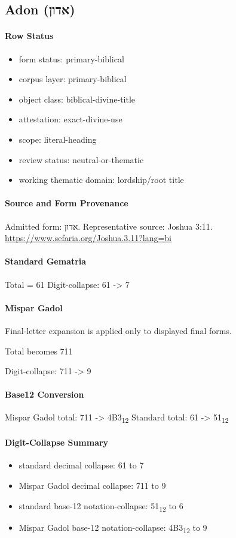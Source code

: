 \subsection{Adon (אדון)}
\paragraph{Row Status}
\begin{itemize}
\item form status: primary-biblical
\item corpus layer: primary-biblical
\item object class: biblical-divine-title
\item attestation: exact-divine-use
\item scope: literal-heading
\item review status: neutral-or-thematic
\item working thematic domain: lordship/root title
\end{itemize}
\paragraph{Source and Form Provenance}
Admitted form: אדון.
Representative source: Joshua 3:11.
\url{https://www.sefaria.org/Joshua.3.11?lang=bi}
\paragraph{Standard Gematria}
Total = 61
Digit-collapse: 61 -> 7
\paragraph{Mispar Gadol}
Final-letter expansion is applied only to displayed final forms.

Total becomes 711

Digit-collapse: 711 -> 9
\paragraph{Base12 Conversion}
Mispar Gadol total: 711 -> 4B3\textsubscript{12}
Standard total: 61 -> 51\textsubscript{12}
\paragraph{Digit-Collapse Summary}
\begin{itemize}
\item standard decimal collapse: 61 to 7
\item Mispar Gadol decimal collapse: 711 to 9
\item standard base-12 notation-collapse: 51\textsubscript{12} to 6
\item Mispar Gadol base-12 notation-collapse: 4B3\textsubscript{12} to 9
\end{itemize}
